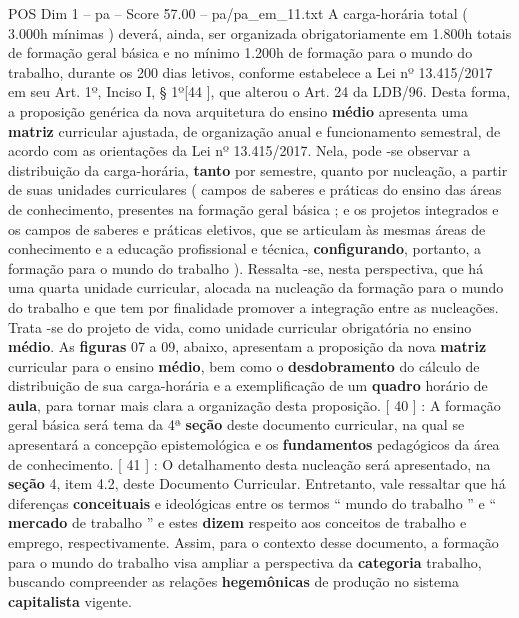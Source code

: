 \begin{textsample}{POS Dim 1 – pa – Score 57.00 – pa/pa\_em\_11.txt}
A carga-horária total ( 3.000h mínimas ) deverá, ainda, ser organizada obrigatoriamente em 1.800h totais de formação geral básica e no mínimo 1.200h de formação para o mundo do trabalho, durante os 200 dias letivos, conforme estabelece a Lei nº 13.415/2017 em seu Art. 1º, Inciso I, § 1º[44 ], que alterou o Art. 24 da LDB/96.
Desta forma, a proposição genérica da nova arquitetura do ensino \textbf{médio} apresenta uma \textbf{matriz} curricular ajustada, de organização anual e funcionamento semestral, de acordo com as orientações da Lei nº 13.415/2017.
Nela, pode -se observar a distribuição da carga-horária, \textbf{tanto} por semestre, quanto por nucleação, a partir de suas unidades curriculares ( campos de saberes e práticas do ensino das áreas de conhecimento, presentes na formação geral básica ; e os projetos integrados e os campos de saberes e práticas eletivos, que se articulam às mesmas áreas de conhecimento e a educação profissional e técnica, \textbf{configurando}, portanto, a formação para o mundo do trabalho ).
Ressalta -se, nesta perspectiva, que há uma quarta unidade curricular, alocada na nucleação da formação para o mundo do trabalho e que tem por finalidade promover a integração entre as nucleações.
Trata -se do projeto de vida, como unidade curricular obrigatória no ensino \textbf{médio}.
As \textbf{figuras} 07 a 09, abaixo, apresentam a proposição da nova \textbf{matriz} curricular para o ensino \textbf{médio}, bem como o \textbf{desdobramento} do cálculo de distribuição de sua carga-horária e a exemplificação de um \textbf{quadro} horário de \textbf{aula}, para tornar mais clara a organização desta proposição. [ 40 ] : A formação geral básica será tema da 4ª \textbf{seção} deste documento curricular, na qual se apresentará a concepção epistemológica e os \textbf{fundamentos} pedagógicos da área de conhecimento. [ 41 ] : O detalhamento desta nucleação será apresentado, na \textbf{seção} 4, item 4.2, deste Documento Curricular.
Entretanto, vale ressaltar que há diferenças \textbf{conceituais} e ideológicas entre os termos “ mundo do trabalho ” e “ \textbf{mercado} de trabalho ” e estes \textbf{dizem} respeito aos conceitos de trabalho e emprego, respectivamente.
Assim, para o contexto desse documento, a formação para o mundo do trabalho visa ampliar a perspectiva da \textbf{categoria} trabalho, buscando compreender as relações \textbf{hegemônicas} de produção no sistema \textbf{capitalista} vigente.

\end{textsample}
